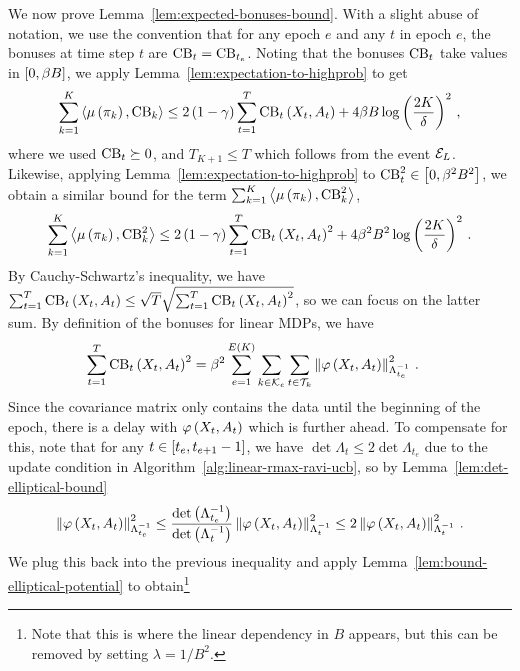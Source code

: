 %

We now prove Lemma~\ref{lem:expected-bonuses-bound}. With a slight abuse of notation, we use the convention that for any epoch $e$ and any $t$ in epoch $e$, the bonuses at time step $t$ are $\operatorname{CB}_t = \operatorname{CB}_{t_e}$. Noting that the bonuses $\operatorname{CB}_t$ take values in $\left[ 0, \beta B \right]$, we apply Lemma~\ref{lem:expectation-to-highprob} to get
%
\begin{equation*}
    \sum_{k=1}^K \left\langle \mu \left( \pi_k \right), \operatorname{CB}_k \right\rangle \leq 2 \left( 1 - \gamma \right) \sum_{t=1}^T \operatorname{CB}_t \left( X_t, A_t \right) + 4 \beta B \log \left( \frac{2 K}{\delta} \right)^2\,,
\end{equation*}
%
where we used $\operatorname{CB}_t \succeq 0$, and $T_{K+1} \leq T$ which follows from the event $\mathcal{E}_L$. Likewise, applying Lemma~\ref{lem:expectation-to-highprob} to $\operatorname{CB}_t^2 \in \left[ 0, \beta^2 B^2 \right]$, we obtain a similar bound for the term $\sum_{k=1}^K \left\langle \mu \left( \pi_k \right), \operatorname{CB}_k^2 \right\rangle$,
%
\begin{equation*}
    \sum_{k=1}^K \left\langle \mu \left( \pi_k \right), \operatorname{CB}_k^2 \right\rangle \leq 2 \left( 1 - \gamma \right) \sum_{t=1}^T \operatorname{CB}_t \left( X_t, A_t \right)^2 + 4 \beta^2 B^2 \log \left( \frac{2 K}{\delta} \right)^2\,.
\end{equation*}
%
By Cauchy-Schwartz's inequality, we have $\sum_{t=1}^T \operatorname{CB}_t \left( X_t, A_t \right) \leq \sqrt{T} \sqrt{\sum_{t=1}^T \operatorname{CB}_t \left( X_t, A_t \right)^2}$, so we can focus on the latter sum. By definition of the bonuses for linear MDPs, we have
%
\begin{align*}
    \sum_{t=1}^T \operatorname{CB}_t \left( X_t, A_t \right)^2 &= \beta^2 \sum_{e=1}^{E \left( K \right)} \sum_{k \in \mathcal{K}_e} \sum_{t \in \mathcal{T}_k} \left\|\varphi \left( X_t, A_t \right)\right\|_{\Lambda_{t_e}^{-1}}^2\,.
\end{align*}
%
Since the covariance matrix only contains the data until the beginning of the epoch, there is a delay with $\varphi \left( X_t, A_t \right)$ which is further ahead. To compensate for this, note that for any $t \in \left[ t_e, t_{e + 1}-1 \right]$, we have $\det \Lambda_t \leq 2 \det \Lambda_{t_e}$ due to the update condition in Algorithm~\ref{alg:linear-rmax-ravi-ucb}, so by Lemma~\ref{lem:det-elliptical-bound}
%
\begin{align*}
    \left\|\varphi \left( X_t, A_t \right)\right\|_{\Lambda_{t_e}^{-1}}^2 \leq \frac{\det \left( \Lambda_{t_e}^{-1} \right)}{\det \left( \Lambda_t^{-1} \right)} \left\|\varphi \left( X_t, A_t \right)\right\|_{\Lambda_t^{-1}}^2 \leq 2 \left\|\varphi \left( X_t, A_t \right)\right\|_{\Lambda_t^{-1}}^2\,.
\end{align*}
%
We plug this back into the previous inequality and apply Lemma~\ref{lem:bound-elliptical-potential} to obtain\footnote{Note that this is where the linear dependency in $B$ appears, but this can be removed by setting $\lambda = 1 / B^2$.}
